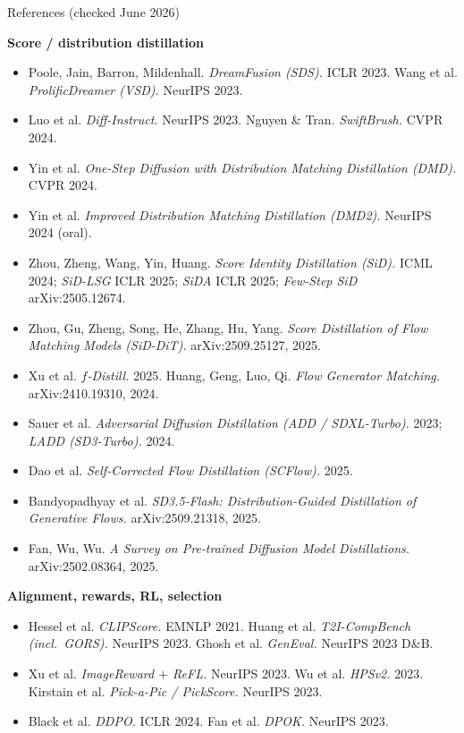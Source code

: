 \documentclass[aspectratio=169,10pt]{beamer}
\begin{document}
\begin{frame}[allowframebreaks]{References (checked June 2026)}
\begin{itemize}
  \end{itemize}
  \textbf{Score / distribution distillation}
  \begin{itemize}
    \item Poole, Jain, Barron, Mildenhall. \emph{DreamFusion (SDS).} ICLR 2023. \quad Wang et al. \emph{ProlificDreamer (VSD).} NeurIPS 2023.
    \item Luo et al. \emph{Diff-Instruct.} NeurIPS 2023. \quad Nguyen \& Tran. \emph{SwiftBrush.} CVPR 2024.
    \item Yin et al. \emph{One-Step Diffusion with Distribution Matching Distillation (DMD).} CVPR 2024.
    \item Yin et al. \emph{Improved Distribution Matching Distillation (DMD2).} NeurIPS 2024 (oral).
    \item Zhou, Zheng, Wang, Yin, Huang. \emph{Score Identity Distillation (SiD).} ICML 2024; \emph{SiD-LSG} ICLR 2025; \emph{SiDA} ICLR 2025; \emph{Few-Step SiD} arXiv:2505.12674.
    \item Zhou, Gu, Zheng, Song, He, Zhang, Hu, Yang. \emph{Score Distillation of Flow Matching Models (SiD-DiT).} arXiv:2509.25127, 2025.
    \item Xu et al. \emph{$f$-Distill.} 2025. \quad Huang, Geng, Luo, Qi. \emph{Flow Generator Matching.} arXiv:2410.19310, 2024.
    \item Sauer et al. \emph{Adversarial Diffusion Distillation (ADD / SDXL-Turbo).} 2023; \emph{LADD (SD3-Turbo).} 2024.
    \item Dao et al. \emph{Self-Corrected Flow Distillation (SCFlow).} 2025.
    \item Bandyopadhyay et al. \emph{SD3.5-Flash: Distribution-Guided Distillation of Generative Flows.} arXiv:2509.21318, 2025.
    \item Fan, Wu, Wu. \emph{A Survey on Pre-trained Diffusion Model Distillations.} arXiv:2502.08364, 2025.
  \end{itemize}
  \textbf{Alignment, rewards, RL, selection}
  \begin{itemize}
    \item Hessel et al. \emph{CLIPScore.} EMNLP 2021. \quad Huang et al. \emph{T2I-CompBench (incl.\ GORS).} NeurIPS 2023. \quad Ghosh et al. \emph{GenEval.} NeurIPS 2023 D\&B.
    \item Xu et al. \emph{ImageReward $+$ ReFL.} NeurIPS 2023. \quad Wu et al. \emph{HPSv2.} 2023. \quad Kirstain et al. \emph{Pick-a-Pic / PickScore.} NeurIPS 2023.
    \item Black et al. \emph{DDPO.} ICLR 2024. \quad Fan et al. \emph{DPOK.} NeurIPS 2023.

\end{itemize}
\end{frame}
\end{document}
